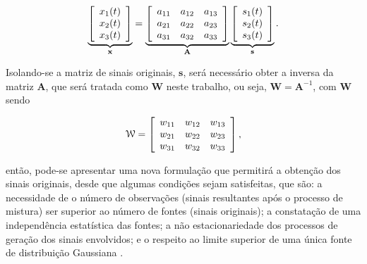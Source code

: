 \begin{equation}
    \underbrace{
    \left[\begin{array}{c}
        x_{1}(t) \\
        x_{2}(t) \\
        x_{3}(t)
    \end{array}\right]}_{\mathbf{x}}
    =
    \underbrace{
    \left[\begin{array}{ccc}
        a_{11} & a_{12} & a_{13} \\
        a_{21} & a_{22} & a_{23} \\
        a_{31} & a_{32} & a_{33}
    \end{array}\right]}_{\mathbf{A}}
    \underbrace{
    \left[\begin{array}{c}
        s_{1}(t) \\
        s_{2}(t) \\
        s_{3}(t)
    \end{array}\right]}_{\mathbf{s}}.
    \vspace{0.2cm}
    \label{eq:bss_weighted_sum_mat}
\end{equation}

Isolando-se a matriz de sinais originais, $\mathbf{s}$, será necessário obter a inversa da matriz $\mathbf{A}$, que será tratada como $\mathbf{W}$ neste trabalho, ou seja, $\mathbf{W} = \mathbf{A}^{-1}$, com $\mathbf{W}$ sendo

\begin{equation}
    \mathbf{\mathcal{W}} = \left[ \begin{array}{ccc}
    w_{11} & w_{12} & w_{13} \\
    w_{21} & w_{22} & w_{23} \\
    w_{31} & w_{32} & w_{33} \end{array} \right],
    \vspace{0.2cm}
\end{equation}

\noindent então, pode-se apresentar uma nova formulação que permitirá a obtenção dos sinais originais, desde que algumas condições sejam satisfeitas, que são: a necessidade de o número de observações (sinais resultantes após o processo de mistura) ser superior ao número de fontes (sinais originais); a constatação de uma independência estatística das fontes; a não estacionariedade dos processos de geração dos sinais envolvidos; e o respeito ao limite superior de uma única fonte de distribuição Gaussiana \citep{COMON1994287, romano2010unsupervised}.

